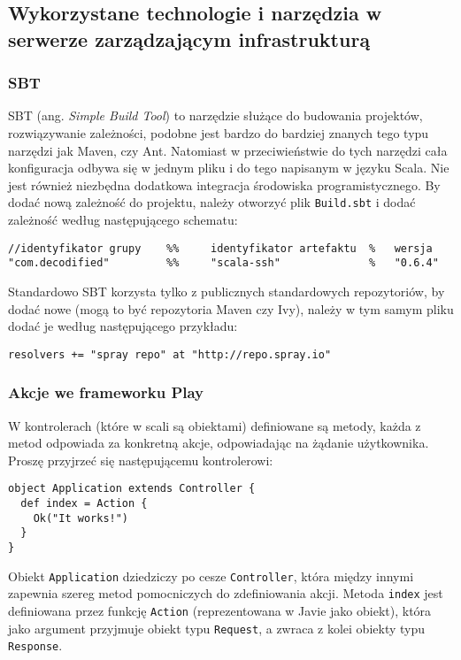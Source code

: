 \subsection{Wykorzystane technologie i narzędzia w serwerze zarządzającym infrastrukturą}

\subsubsection{SBT}

SBT (ang. \emph{Simple Build Tool}) to narzędzie służące do budowania projektów, rozwiązywanie zależności, podobne jest bardzo do bardziej znanych tego typu narzędzi jak Maven, czy Ant. Natomiast w przeciwieństwie do tych narzędzi cała konfiguracja odbywa się w jednym pliku i do tego napisanym w języku Scala. Nie jest również niezbędna dodatkowa integracja środowiska programistycznego. By dodać nową zależność do projektu, należy otworzyć plik \lstinline|Build.sbt| i dodać zależność według następującego schematu:

\begin{lstlisting}
//identyfikator grupy    %%     identyfikator artefaktu  %   wersja
"com.decodified"         %%     "scala-ssh"              %   "0.6.4"
\end{lstlisting}

Standardowo SBT korzysta tylko z publicznych standardowych repozytoriów, by dodać nowe (mogą to być repozytoria Maven czy Ivy), należy w tym samym pliku dodać je według następującego przykładu:

\begin{lstlisting}
resolvers += "spray repo" at "http://repo.spray.io"
\end{lstlisting}

\subsubsection{Akcje we frameworku Play}

W kontrolerach (które w scali są obiektami) definiowane są metody, każda z metod odpowiada za konkretną akcje, odpowiadając na żądanie użytkownika. Proszę przyjrzeć się następującemu kontrolerowi:

\begin{lstlisting}
object Application extends Controller {
  def index = Action {
    Ok("It works!")
  }
}
\end{lstlisting}

Obiekt \lstinline{Application} dziedziczy po cesze \lstinline{Controller}, która między innymi zapewnia szereg metod pomocniczych do zdefiniowania akcji. Metoda \lstinline{index} jest definiowana przez funkcję \lstinline{Action} (reprezentowana w Javie jako obiekt), która jako argument przyjmuje obiekt typu \lstinline{Request}, a zwraca z kolei obiekty typu \lstinline{Response}. 

